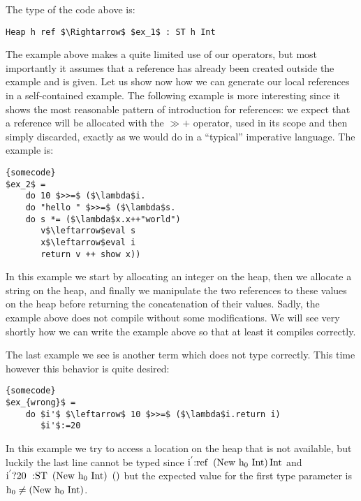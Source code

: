 \documentclass[a4paper]{article}
\begin{document}
The type of the code above is:

\begin{lstlisting}
Heap h ref $\Rightarrow$ $ex_1$ : ST h Int
\end{lstlisting}



The example above makes a quite limited use of our operators, but most importantly it assumes that a reference has already been created outside the example and is given. Let us show now how we can generate our local references in a self-contained example. The following example is more interesting since it shows the most reasonable pattern of introduction for references: we expect that a reference will be allocated with the $\gg +$ operator, used in its scope and then simply discarded, exactly as we would do in a ``typical'' imperative language. The example is:


\begin{lstlisting}[frame=tb,mathescape]{somecode}
$ex_2$ =
	do 10 $>>=$ ($\lambda$i.
	do "hello " $>>=$ ($\lambda$s.
	do s *= ($\lambda$x.x++"world")
	   v$\leftarrow$eval s
	   x$\leftarrow$eval i
	   return v ++ show x))
\end{lstlisting}

In this example we start by allocating an integer on the heap, then we allocate a string on the heap, and finally we manipulate the two references to these values on the heap before returning the concatenation of their values. Sadly, the example above does not compile without some modifications. We will see very shortly how we can write the example above so that at least it compiles correctly.

 The last example we see is another term which does not type correctly. This time however this behavior is quite desired:

\begin{lstlisting}[frame=tb,mathescape]{somecode}
$ex_{wrong}$ =
	do $i'$ $\leftarrow$ 10 $>>=$ ($\lambda$i.return i)
	   $i'$:=20
\end{lstlisting}

In this example we try to access a location on the heap that is not available, but luckily the last line cannot be typed since ${{\rm i}}^{{\rm '}}{\rm :}{\rm ref}{\rm \ }\left({\rm New}{\rm \ }{{\rm h}}_0{\rm \ }{\rm Int}\right){\rm Int}$ and ${{\rm i}}^{{\rm '}}?{\rm 20\ :}{\rm ST}{\rm \ }\left({\rm New}{\rm \ }{{\rm h}}_0{\rm \ }{\rm Int}\right){\rm \ }{\rm ()}$ but the expected value for the first type parameter is ${{\rm h}}_0\ne {\rm (New\ }{{\rm h}}_0{\rm \ Int)}$.

 
\end{document}
